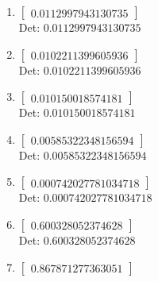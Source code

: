 \documentclass[12pt]{article}
\begin{document}
\begin{enumerate}

\item $\displaystyle \left[\begin{matrix}0.0112997943130735\end{matrix}\right]$\\

Det: $0.0112997943130735$\\

\item $\displaystyle \left[\begin{matrix}0.0102211399605936\end{matrix}\right]$\\

Det: $0.0102211399605936$\\

\item $\displaystyle \left[\begin{matrix}0.010150018574181\end{matrix}\right]$\\

Det: $0.010150018574181$\\

\item $\displaystyle \left[\begin{matrix}0.00585322348156594\end{matrix}\right]$\\

Det: $0.00585322348156594$\\

\item $\displaystyle \left[\begin{matrix}0.000742027781034718\end{matrix}\right]$\\

Det: $0.000742027781034718$\\

\item $\displaystyle \left[\begin{matrix}0.600328052374628\end{matrix}\right]$\\

Det: $0.600328052374628$\\

\item $\displaystyle \left[\begin{matrix}0.867871277363051\end{matrix}\right]$\\


\end{enumerate}
\end{document}

